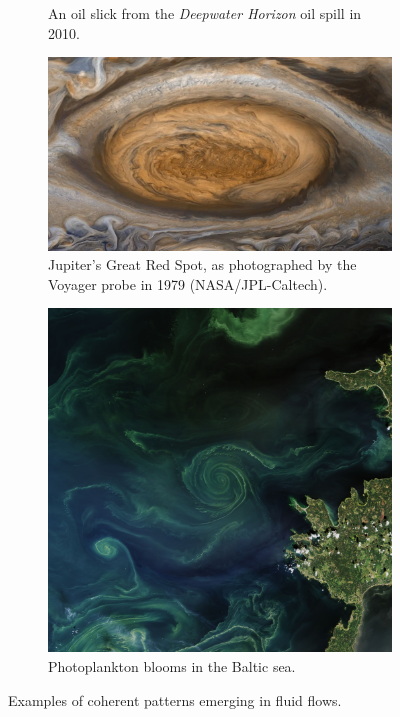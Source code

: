 \begin{figure}
	\begin{center}
		\begin{subfigure}{0.49\textwidth}
			\caption{An oil slick from the \emph{Deepwater Horizon} oil spill in 2010.}
		\end{subfigure}
		\begin{subfigure}{0.49\textwidth}
			\includegraphics[width=\textwidth]{chp02_background/figures/red_spot.png}
			\caption{Jupiter's Great Red Spot, as photographed by the Voyager probe in 1979 (NASA/JPL-Caltech).}
		\end{subfigure}
		\begin{subfigure}{0.49\textwidth}
			\includegraphics[width=\textwidth]{chp02_background/figures/photoplankton}
			\caption{Photoplankton blooms in the Baltic sea.}
		\end{subfigure}

		\caption{Examples of coherent patterns emerging in fluid flows.}
		\label{fig:lcs_examples}
	\end{center}
\end{figure}


